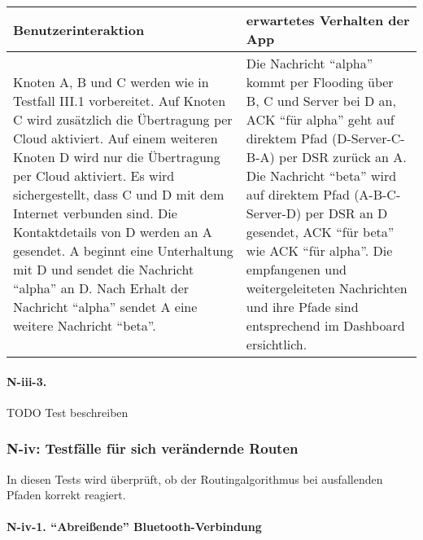 \begin{longtable}{p{8cm}p{8.5cm}}
\toprule
Benutzerinteraktion & erwartetes Verhalten der App\tabularnewline
\midrule
\endhead
Knoten A, B und C werden wie in Testfall III.1 vorbereitet. Auf Knoten C
wird zusätzlich die Übertragung per Cloud aktiviert. Auf einem weiteren
Knoten D wird nur die Übertragung per Cloud aktiviert. Es wird
sichergestellt, dass C und D mit dem Internet verbunden sind. Die
Kontaktdetails von D werden an A gesendet. A beginnt eine Unterhaltung
mit D und sendet die Nachricht ``alpha'' an D. Nach Erhalt der Nachricht
``alpha'' sendet A eine weitere Nachricht ``beta''. & Die Nachricht
``alpha'' kommt per Flooding über B, C und Server bei D an, ACK ``für
alpha'' geht auf direktem Pfad (D-Server-C-B-A) per DSR zurück an A. Die
Nachricht ``beta'' wird auf direktem Pfad (A-B-C-Server-D) per DSR an D
gesendet, ACK ``für beta'' wie ACK ``für alpha''. Die empfangenen und
weitergeleiteten Nachrichten und ihre Pfade sind entsprechend im
Dashboard ersichtlich.\tabularnewline
\bottomrule
\end{longtable}

\paragraph{N-iii-3.}\label{section}

TODO Test beschreiben





\clearpage
\subsubsection{N-iv: Testfälle für sich verändernde
Routen}\label{iv-testfuxe4lle-fuxfcr-sich-veruxe4ndernde-routen}

In diesen Tests wird überprüft, ob der Routingalgorithmus bei
ausfallenden Pfaden korrekt reagiert.

\paragraph{\texorpdfstring{N-iv-1. ``Abreißende''
Bluetooth-Verbindung}{N-iv-1. Abreißende Bluetooth-Verbindung}}\label{abreiuxdfende-bluetooth-verbindung}

